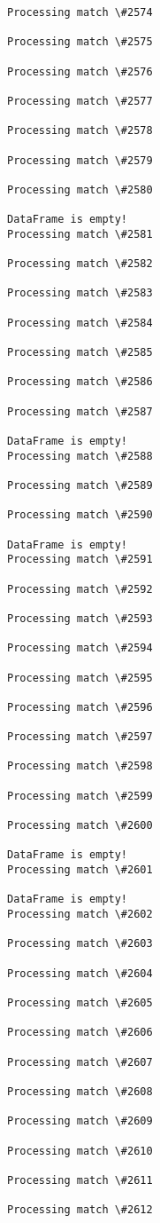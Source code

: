 \documentclass[11pt]{article}
\begin{document}
\begin{Verbatim}[commandchars=\\\{\}]
Processing match \#2574

Processing match \#2575

Processing match \#2576

Processing match \#2577

Processing match \#2578

Processing match \#2579

Processing match \#2580

DataFrame is empty!
Processing match \#2581

Processing match \#2582

Processing match \#2583

Processing match \#2584

Processing match \#2585

Processing match \#2586

Processing match \#2587

DataFrame is empty!
Processing match \#2588

Processing match \#2589

Processing match \#2590

DataFrame is empty!
Processing match \#2591

Processing match \#2592

Processing match \#2593

Processing match \#2594

Processing match \#2595

Processing match \#2596

Processing match \#2597

Processing match \#2598

Processing match \#2599

Processing match \#2600

DataFrame is empty!
Processing match \#2601

DataFrame is empty!
Processing match \#2602

Processing match \#2603

Processing match \#2604

Processing match \#2605

Processing match \#2606

Processing match \#2607

Processing match \#2608

Processing match \#2609

Processing match \#2610

Processing match \#2611

Processing match \#2612


\end{Verbatim}
\end{document}
